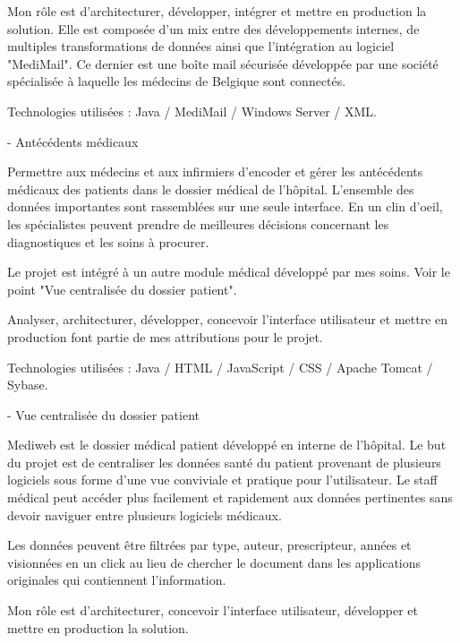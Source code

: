 \begin{cventries}
{    Mon rôle est d'architecturer, développer, intégrer et mettre en production la solution. Elle est composée d'un mix entre des développements internes, de multiples transformations de données ainsi que l'intégration au logiciel "MediMail". Ce dernier est une boîte mail sécurisée développée par une société spécialisée à laquelle les médecins de Belgique sont connectés. 

    Technologies utilisées : Java / MediMail / Windows Server / XML.

    }
    
   
  \cventry
    {-} %
    {Antécédents médicaux} %
    {} %
    {} %
    {
    Permettre aux médecins et aux infirmiers d'encoder et gérer les antécédents médicaux des patients dans le dossier médical de l'hôpital. L'ensemble des données importantes sont rassemblées sur une seule interface. En un clin d'oeil, les spécialistes peuvent prendre de meilleures décisions concernant les diagnostiques et les soins à procurer.
    
    Le projet est intégré à un autre module médical développé par mes soins. Voir le point "Vue centralisée du dossier patient".
    
    Analyser, architecturer, développer, concevoir l'interface utilisateur et mettre en production font partie de mes attributions pour le projet. 


    Technologies utilisées : Java / HTML / JavaScript / CSS / Apache Tomcat / Sybase.

    }
    
    
   
  \cventry
    {-} %
    {Vue centralisée du dossier patient} %
    {} %
    {} %
    {
    Mediweb est le dossier médical patient développé en interne de l'hôpital. Le but du projet est de centraliser les données santé du patient provenant de plusieurs logiciels sous forme d'une vue conviviale et pratique pour l'utilisateur. Le staff médical peut accéder plus facilement et rapidement aux données pertinentes sans devoir naviguer entre plusieurs logiciels médicaux.
    
    Les données peuvent être filtrées par type, auteur, prescripteur, années et visionnées en un click au lieu de chercher le document dans les applications originales qui contiennent l'information.


    Mon rôle est d'architecturer, concevoir l'interface utilisateur, développer et mettre en production la solution.


}
\end{cventries}
